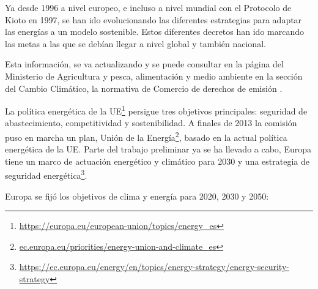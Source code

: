 Ya desde 1996 a nivel europeo, e incluso a nivel mundial con el
Protocolo de Kioto en 1997, se han ido evolucionando las diferentes
estrategias para adaptar las energías a un modelo sostenible. Estos
diferentes decretos han ido marcando las metas a las que se debían
llegar a nivel global y también nacional.

Esta información, se va actualizando y se puede consultar en la página del Ministerio de Agricultura y pesca, alimentación y medio ambiente en la sección del Cambio Climático, la normativa de Comercio
de derechos de emisión \cite{emision}.

La política energética de la UE\footnote{\url{https://europa.eu/european-union/topics/energy_es}}
persigue tres objetivos principales: seguridad de
abastecimiento, competitividad y sostenibilidad. A finales de 2013 la
comisión puso en marcha un plan, Unión de la
Energía\footnote{\url{ec.europa.eu/priorities/energy-union-and-climate_es}}, basado en la actual política energética de la UE. Parte del
trabajo preliminar ya se ha llevado a cabo, Europa tiene un marco
de actuación energético y climático para 2030 \cite{ue2030}
 y una estrategia
 de seguridad energética\footnote{\url{https://ec.europa.eu/energy/en/topics/energy-strategy/energy-security-strategy}}.

Europa se fijó los objetivos de clima y energía para 2020, 2030 y 2050:

